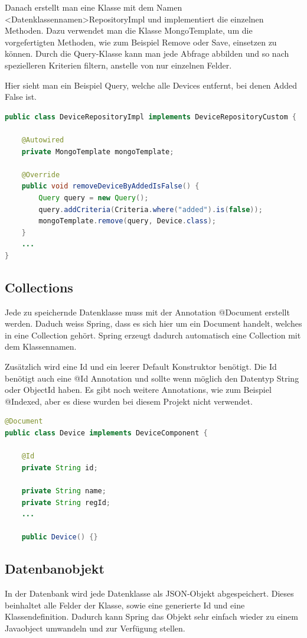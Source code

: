 Danach erstellt man eine Klasse mit dem Namen <Datenklassennamen>RepositoryImpl und implementiert die einzelnen Methoden. Dazu verwendet man die Klasse MongoTemplate, um die vorgefertigten Methoden, wie zum Beispiel Remove oder Save, einsetzen zu können. Durch die Query-Klasse kann man jede Abfrage abbilden und so nach spezielleren Kriterien filtern, anstelle von nur einzelnen Felder.

Hier sieht man ein Beispiel Query, welche alle Devices entfernt, bei denen Added False ist. 
\begin{lstlisting}[language=java]
public class DeviceRepositoryImpl implements DeviceRepositoryCustom {

	@Autowired
	private MongoTemplate mongoTemplate;

	@Override
	public void removeDeviceByAddedIsFalse() {
		Query query = new Query();
		query.addCriteria(Criteria.where("added").is(false));
		mongoTemplate.remove(query, Device.class);
	}
	...
}
\end{lstlisting}
\subsection{Collections}
Jede zu speichernde Datenklasse muss mit der Annotation @Document erstellt werden. Daduch weiss Spring, dass es sich hier um ein Document handelt, welches in eine Collection gehört. Spring erzeugt dadurch automatisch eine Collection mit dem Klassennamen.

Zusätzlich wird eine Id und ein leerer Default Konstruktor benötigt. Die Id benötigt auch eine @Id Annotation und sollte wenn möglich den Datentyp String oder ObjectId haben. Es gibt noch weitere Annotations, wie zum Beispiel @Indexed, aber es diese wurden bei diesem Projekt nicht verwendet. 
\begin{lstlisting}[language=java]
@Document
public class Device implements DeviceComponent {

	@Id
	private String id;

	private String name;
	private String regId;
	...
	
	public Device() {}
\end{lstlisting}

\subsection{Datenbanobjekt}
In der Datenbank wird jede Datenklasse als JSON-Objekt abgespeichert. Dieses beinhaltet alle Felder der Klasse, sowie eine generierte Id und eine Klassendefinition. Dadurch kann Spring das Objekt sehr einfach wieder zu einem Javaobject umwandeln und zur Verfügung stellen.

